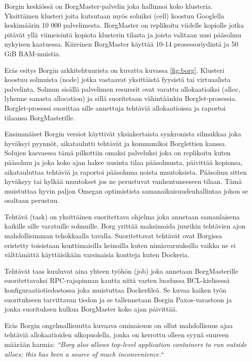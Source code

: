 \documentclass[finnish,gradu]{tktltiki3}
\begin{document}
    Borgin keskiössä on BorgMaster-palvelin joka hallinnoi koko klusteria. Yksittäinen klusteri joita kutsutaan myös soluiksi (cell) koostuu Googlella keskimäärin 10 000 palvelimesta. BorgMaster on replikoitu viidelle kopiolle jotka pitävät yllä viimeisintä kopiota klusterin tilasta ja joista valitaan uusi pääsolmu nykyisen kaatuessa. Kiireinen BorgMaster käyttää 10-14 prosessoriydintä ja 50 GiB RAM-muistia.
    
    Eräs esitys Borgin arkkitehtuurista on kuvattu kuvassa \ref{fig:borg}. Klusteri koostuu solmuista (node) jotka vastaavat yksittäistä fyysistä tai virtuaalista palvelinta. Solmun sisällä palvelimen resurssit ovat varattu allokaatioiksi (alloc, lyhenne sanasta allocation) ja sillä suoritetaan vähintäänkin Borglet-prosessia. Borglet-prosessi suorittaa sille annettuja tehtäviä allokaatioissa ja raportoi tilaansa BorgMasterille.
    
    Ensimmäiset Borgin versiot käyttivät yksinkertaista synkronista silmukkaa joka hyväksyi pyynnöt, aikataulutti tehtävät ja kommunikoi Borglettien kanssa. Solujen kasvaessa tämä pilkottiin omaksi palveluksi joka on replikoitu kuten pääsolmu ja joka koko ajan hakee uusinta tilaa pääsolmusta, päivittää kopionsa, aikatauluttaa tehtäviä ja raportoi pääsolmua noista muutoksista. Pääsolmu sitten hyväksyy tai hylkää muutokset jos ne perustuvat vanhentuneeseen tilaan. Tämä muistuttaa hyvin paljon Omegan optimistista samanaikaisuudenhallintaa johon se osaltaan perustuu.
    
    Tehtävä (task) on yksittäinen suoritettava ohjelma joka annetaan samanlaisena kaikille sille varatuille solmuille. Borg yrittää maksimoida juurikin tehtävien ajon mahdollisimman tehokkaalla tavalla. Suoritettavat tehtävät ovat Borgissa eristetty toisistaan konttimaisilla keinoilla kuten nimiavaruuksilla vaikka ne ei välttämättä käyttäisikään varsinaisia kontteja kuten Dockeria.
    
    Tehtävät taas kuuluvat aina yhteen työhön (job) joka annetaan BorgMasterille suoritettavaksi RPC-rajapinnan kautta niitä varten luodussa BCL-kielisessä konfiguraatiotiedostossa joka muistuttaa Dockerfileä. Se kuvaa kaiken työn suoritukseen tarvittavan tiedon ja se tallennetaan Borgin Paxos-varastoon ja jonka suorituksen kulkua BorgMaster koko ajan päivittää.
    
    Eräs Borgin ongelmallisuutta kuvaava ominaisuus on ollut mahdollisuus ajaa tehtäviä allokaatioiden ulkopuolella, jonka on kerrottu olleen syynä suureen määrään harmia: \textit{``Borg also allows top-level application containers to run outside allocs; this has been a source of much inconvenience.``}
    
\end{document}
